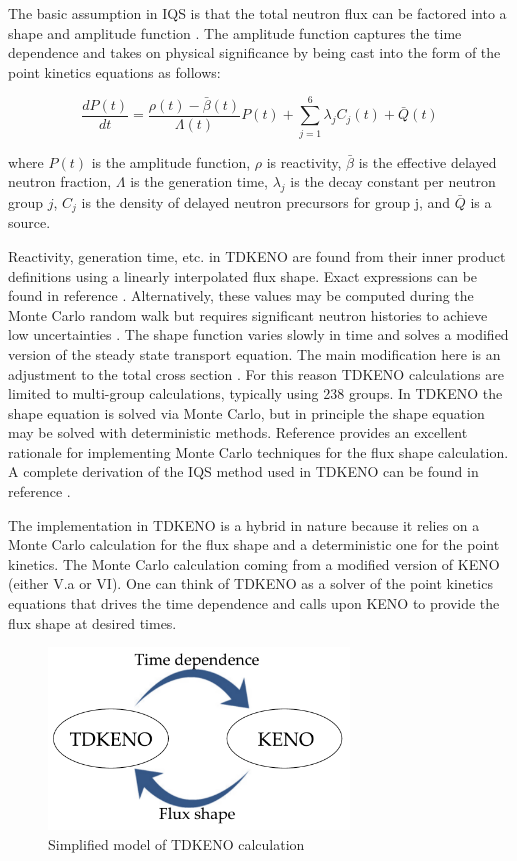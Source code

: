 \documentclass[11pt]{article}
\begin{document}
The basic assumption in IQS is that the total neutron flux can be factored into a shape and amplitude function \cite{Gehin}.  The amplitude function captures the time dependence and takes on physical significance by being cast into the form of the point kinetics equations as follows:

\begin{equation}
    \label{eq:pt_kin}
    \frac{dP(t)}{dt} = \frac{\rho(t)-\bar{\beta}(t)}{\Lambda(t)} P(t) + \sum_{j=1}^{6} \lambda_jC_j(t) + \bar{Q}(t)
\end{equation}

where $P(t)$ is the amplitude function, $\rho$ is reactivity, $\bar{\beta}$ is the effective delayed neutron fraction, $\Lambda$ is the generation time, $\lambda_j$ is the decay constant per neutron group $j$, $C_j$ is the density of delayed neutron precursors for group j, and $\bar{Q}$ is a source.

 Reactivity, generation time, etc. in TDKENO are found from their inner product definitions using a linearly interpolated flux shape. Exact expressions can be found in reference \cite{Bentley}.  Alternatively, these values may be computed during the Monte Carlo random walk but requires significant neutron histories to achieve low uncertainties \cite{Waddell}.  The shape function varies slowly in time and solves a modified version of the steady state transport equation.  The main modification here is an adjustment to the total cross section \cite{goluoglu2001time}\cite{Gehin}.  For this reason TDKENO calculations are limited to multi-group calculations, typically using 238 groups.  In TDKENO the shape equation is solved via Monte Carlo, but in principle the shape equation may be solved with deterministic methods.  Reference \cite{Shayesteh} provides an excellent rationale for implementing Monte Carlo techniques for the flux shape calculation.  A complete derivation of the IQS method used in TDKENO can be found in reference \cite{Bentley}. 
 
 The implementation in TDKENO is a hybrid in nature because it relies on a Monte Carlo calculation for the flux shape and a deterministic one for the point kinetics.  The Monte Carlo calculation coming from a modified version of KENO (either V.a or VI).  One can think of TDKENO as a solver of the point kinetics equations that drives the time dependence and calls upon KENO to provide the flux shape at desired times. 
 \begin{figure}
     \centering
     \includegraphics[width=8cm]{figures/tdkeno_flow.pdf}
     \caption{Simplified model of TDKENO calculation}
     \label{fig:simpletdk}
 \end{figure}
\end{document}
